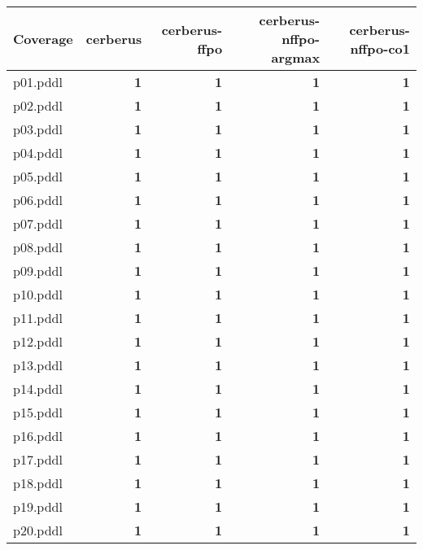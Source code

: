 \documentclass{article}
\begin{document}
\begin{tabular}{@{}lrrrr@{}}
Coverage & cerberus & cerberus-ffpo & cerberus-nffpo-argmax & cerberus-nffpo-co1 \\
\midrule
p01.pddl & \textbf{1} & \textbf{1} & \textbf{1} & \textbf{1} \\
p02.pddl & \textbf{1} & \textbf{1} & \textbf{1} & \textbf{1} \\
p03.pddl & \textbf{1} & \textbf{1} & \textbf{1} & \textbf{1} \\
p04.pddl & \textbf{1} & \textbf{1} & \textbf{1} & \textbf{1} \\
p05.pddl & \textbf{1} & \textbf{1} & \textbf{1} & \textbf{1} \\
p06.pddl & \textbf{1} & \textbf{1} & \textbf{1} & \textbf{1} \\
p07.pddl & \textbf{1} & \textbf{1} & \textbf{1} & \textbf{1} \\
p08.pddl & \textbf{1} & \textbf{1} & \textbf{1} & \textbf{1} \\
p09.pddl & \textbf{1} & \textbf{1} & \textbf{1} & \textbf{1} \\
p10.pddl & \textbf{1} & \textbf{1} & \textbf{1} & \textbf{1} \\
p11.pddl & \textbf{1} & \textbf{1} & \textbf{1} & \textbf{1} \\
p12.pddl & \textbf{1} & \textbf{1} & \textbf{1} & \textbf{1} \\
p13.pddl & \textbf{1} & \textbf{1} & \textbf{1} & \textbf{1} \\
p14.pddl & \textbf{1} & \textbf{1} & \textbf{1} & \textbf{1} \\
p15.pddl & \textbf{1} & \textbf{1} & \textbf{1} & \textbf{1} \\
p16.pddl & \textbf{1} & \textbf{1} & \textbf{1} & \textbf{1} \\
p17.pddl & \textbf{1} & \textbf{1} & \textbf{1} & \textbf{1} \\
p18.pddl & \textbf{1} & \textbf{1} & \textbf{1} & \textbf{1} \\
p19.pddl & \textbf{1} & \textbf{1} & \textbf{1} & \textbf{1} \\
p20.pddl & \textbf{1} & \textbf{1} & \textbf{1} & \textbf{1} \\
\end{tabular}
\end{document}
